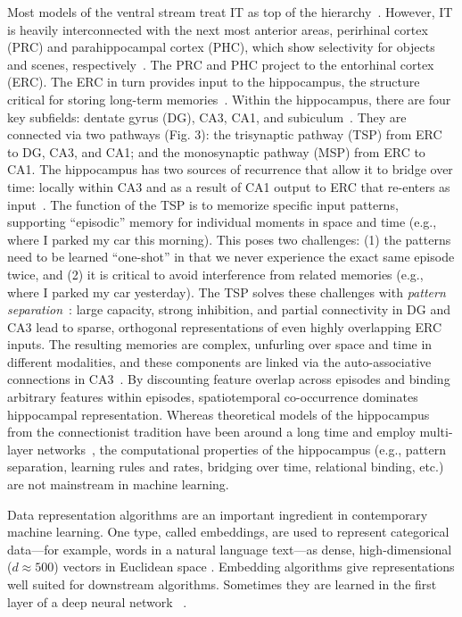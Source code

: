 Most models of the ventral stream treat IT as top of
the hierarchy~\citep[cf.][]{Saksida:2010}. However, IT is heavily interconnected with
the next most anterior areas, perirhinal cortex (PRC) and
parahippocampal cortex (PHC), which show selectivity for
objects and scenes,
respectively~\citep{Barense:2010,Davachi:2006,Ranganath:2012}. The PRC
and PHC project to the entorhinal cortex (ERC). The ERC in turn
provides input to the hippocampus, the structure critical for storing
long-term memories~\citep{Squire:1992}. Within the hippocampus, there
are four key subfields: dentate gyrus (DG), CA3, CA1, and
subiculum~\citep{Deng:2010,Shohamy:2013}. They are
connected via two pathways (Fig. 3): the trisynaptic pathway (TSP) from ERC
to DG, CA3, and CA1; and the monosynaptic pathway (MSP) from ERC to
CA1. The hippocampus has two sources of
recurrence that allow it to bridge over time: locally within CA3 and
as a result of CA1 output to ERC that re-enters as
input~\citep{Kumaran:2016}. The function of the TSP is to
memorize specific input patterns, supporting ``episodic''
memory for individual moments in space and time (e.g., where I parked
my car this morning). This poses two challenges: (1) the
patterns need to be learned ``one-shot'' in that we never experience
the exact same episode twice, and (2) it is critical to avoid interference
from related memories (e.g., where I parked my car yesterday). The TSP
solves these challenges with \textit{pattern
separation}~\citep{Leutgeb:2007,Yassa:2011,Rolls:2016}: large capacity,
strong inhibition, and partial connectivity in DG and CA3 lead to
sparse, orthogonal representations of even highly overlapping ERC
inputs. The resulting memories are complex, unfurling over space and
time in different modalities, and these
components are linked via the auto-associative connections in
CA3~\citep{Wallenstein:1998}. By discounting feature overlap across
episodes and binding arbitrary features within episodes,
spatiotemporal co-occurrence dominates hippocampal representation.
Whereas theoretical models of the hippocampus from the connectionist
tradition have been around a long time and employ multi-layer
networks~\citep{McClelland:1995,Norman:2003}, the computational
properties of the hippocampus (e.g., pattern separation, learning rules and rates, 
bridging over time, relational binding, etc.) are not mainstream in machine learning.

\statbackground{}
Data representation algorithms are an important ingredient in contemporary
machine learning. One type, called embeddings, are used to represent
categorical data---for example, words in a natural language text---as
dense, high-dimensional ($d\approx 500$) vectors in Euclidean space \citep{Mikolov:2013}.
Embedding algorithms give representations well suited for downstream
algorithms. Sometimes they are learned in the first layer of
a deep neural network ~\citep{Bengio:2003}.  


